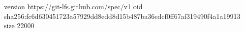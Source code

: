 version https://git-lfs.github.com/spec/v1
oid sha256:fc6d630451723a57929dd8edd8d15b487ba36edcf0ff67af319490f4a1a19913
size 22000
